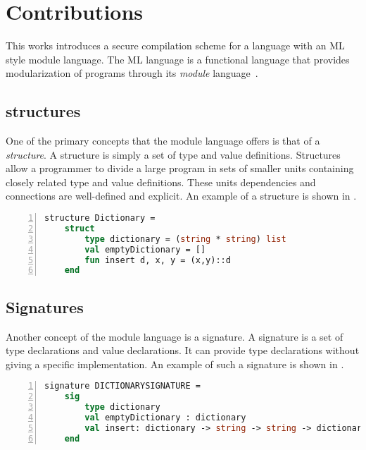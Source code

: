 \documentclass[11pt]{article}
\begin{document}
\section{Contributions}
This works introduces a secure compilation scheme for a language with an ML style module language.
The ML language is a functional language that provides modularization of programs through its \emph{module} language~\cite{Milner:1997:DSM:549659}.

\subsection{structures}
One of the primary concepts that the module language offers is that of a \emph{structure}. A structure is simply a set of type and value definitions.
Structures allow a programmer to divide a large program in sets of smaller units containing closely related type and value definitions.
These units dependencies and connections are well-defined and explicit.
An example of a structure is shown in .

\begin{lstlisting}[frame=single, language=ML,caption={[Dictionary Definition Example]An example structure showing the definition of a dictionary in ML.}, label=lst:DictionaryStructureExample,numbers=left]
structure Dictionary =
    struct
        type dictionary = (string * string) list
        val emptyDictionary = []
        fun insert d, x, y = (x,y)::d
    end
\end{lstlisting}

\subsection{Signatures}
Another concept of the module language is a signature.
A signature is a set of type declarations and value declarations. It can provide type declarations without giving a specific implementation.
An example of such a signature is shown in .

\begin{lstlisting}[frame=single, language=ML, caption={[Dictionary Declaration Example]An example signature showing the declaration of a dictionary in ML.}, label=lst:DictionarySignatureExample, numbers=left]
signature DICTIONARYSIGNATURE =
    sig
        type dictionary
        val emptyDictionary : dictionary
        val insert: dictionary -> string -> string -> dictionary
    end
\end{lstlisting}
\end{document}
